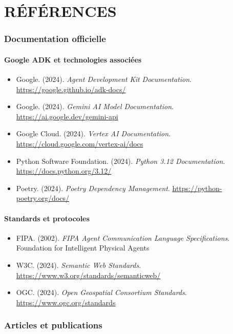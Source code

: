 \chapter{RÉFÉRENCES}

\subsection{Documentation officielle}

\subsubsection{Google ADK et technologies associées}
\begin{itemize}
    \item Google. (2024). \textit{Agent Development Kit Documentation}. \url{https://google.github.io/adk-docs/}
    \item Google. (2024). \textit{Gemini AI Model Documentation}. \url{https://ai.google.dev/gemini-api}
    \item Google Cloud. (2024). \textit{Vertex AI Documentation}. \url{https://cloud.google.com/vertex-ai/docs}
    \item Python Software Foundation. (2024). \textit{Python 3.12 Documentation}. \url{https://docs.python.org/3.12/}
    \item Poetry. (2024). \textit{Poetry Dependency Management}. \url{https://python-poetry.org/docs/}
\end{itemize}

\subsubsection{Standards et protocoles}
\begin{itemize}
    \item FIPA. (2002). \textit{FIPA Agent Communication Language Specifications}. Foundation for Intelligent Physical Agents
    \item W3C. (2024). \textit{Semantic Web Standards}. \url{https://www.w3.org/standards/semanticweb/}
    \item OGC. (2024). \textit{Open Geospatial Consortium Standards}. \url{https://www.ogc.org/standards}
\end{itemize}

\subsection{Articles et publications}

